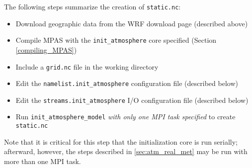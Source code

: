 The following steps summarize the creation of {\tt static.nc}:

\begin{itemize}
\item Download geographic data from the WRF download page (described above) 
\item Compile MPAS with the {\tt init\_atmosphere} core specified (Section \ref{compiling_MPAS})
\item Include a {\tt grid.nc} file in the working directory
\item Edit the {\tt namelist.init\_atmosphere} configuration file (described below)
\item Edit the {\tt streams.init\_atmosphere} I/O configuration file (described below)
\item Run {\tt init\_atmosphere\_model} {\em with only one MPI task specified} to create {\tt static.nc}
\end{itemize}
Note that it is critical for this step that the initialization core is run serially; afterward, however, the steps described in \ref{sec:atm_real_met} may be run with more than one MPI task.

